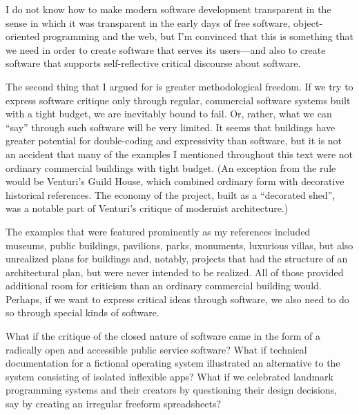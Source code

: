 I do not know how to make modern software development transparent in the sense in which it
was transparent in the early days of free software, object-oriented programming and the
web, but I'm convinced that this is something that we need in order to create software that
serves its users---and also to create software that supports self-reflective
critical discourse about software.

The second thing that I argued for is greater methodological freedom. If we try to express
software critique only through regular, commercial software systems built with a tight budget,
we are inevitably bound to fail. Or, rather, what we can ``say'' through such software
will be very limited. It seems that buildings have greater potential for double-coding and
expressivity than software, but it is not an accident that many of the examples I mentioned
throughout this text were not ordinary commercial buildings with tight budget. (An exception
from the rule would be Venturi's Guild House, which combined ordinary form with decorative
historical references. The economy of the project, built as a ``decorated shed'',
was a notable part of Venturi's critique of modernist architecture.)

The examples that were featured prominently as my references included museums, public buildings,
pavilions, parks, monuments, luxurious villas, but also unrealized plans for buildings
and, notably, projects that had the structure of an architectural plan, but were never
intended to be realized. All of those provided additional room for criticism than an
ordinary commercial building would. Perhaps, if we want to express critical ideas through
software, we also need to do so through special kinds of software.

What if the critique of the closed nature of software came in the form of a radically open
and accessible public service software? What if technical documentation for a fictional
operating system illustrated an alternative to the system consisting of isolated inflexible
apps? What if we celebrated landmark programming systems and their creators by questioning
their design decisions, say by creating an irregular freeform spreadsheets?

\newpage
\theendnotes

